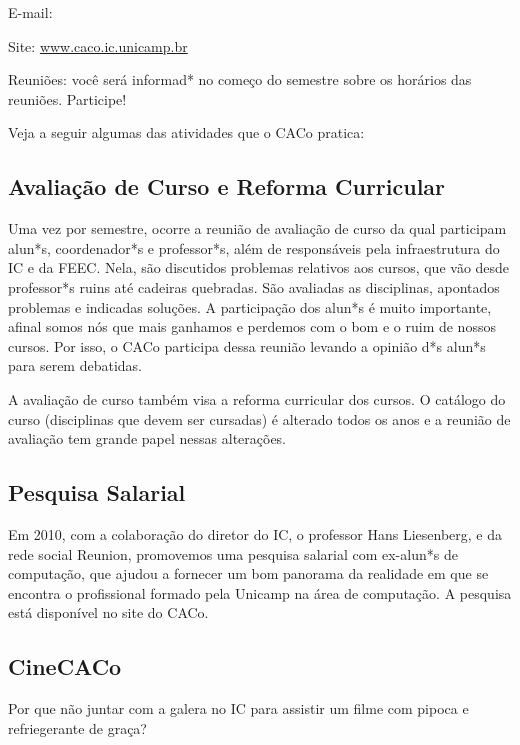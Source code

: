 \begin{compactitemize}
    \item  E-mail: 
    \item  Site: \url{www.caco.ic.unicamp.br}
    \item  Reuniões: você será informad* no começo do semestre sobre os horários
        das reuniões. Participe!
\end{compactitemize}

Veja a seguir algumas das atividades que o CACo pratica:

\subsection{Avaliação de Curso e Reforma Curricular}

Uma vez por semestre, ocorre a reunião de avaliação de curso da qual participam
alun*s, coordenador*s e professor*s, além de responsáveis pela infraestrutura do
IC e da FEEC. Nela, são discutidos problemas relativos aos cursos, que vão desde
professor*s ruins até cadeiras quebradas. São avaliadas as disciplinas,
apontados problemas e indicadas soluções. A participação dos alun*s é muito
importante, afinal somos nós que mais ganhamos e perdemos com o bom e o ruim de
nossos cursos. Por isso, o CACo participa dessa reunião levando a opinião d*s
alun*s para serem debatidas.

A avaliação de curso também visa a reforma curricular dos cursos. O catálogo do
curso (disciplinas que devem ser cursadas) é alterado todos os anos e a reunião
de avaliação tem grande papel nessas alterações.

\subsection{Pesquisa Salarial}

Em 2010, com a colaboração do diretor do IC, o professor Hans Liesenberg, e da
rede social Reunion, promovemos uma pesquisa salarial com ex-alun*s de
computação, que ajudou a fornecer um bom panorama da realidade em que se
encontra o profissional formado pela Unicamp na área de computação. A pesquisa
está disponível no site do CACo.

\subsection{CineCACo}

Por que não juntar com a galera no IC para assistir um filme com pipoca e
refriegerante de graça?

